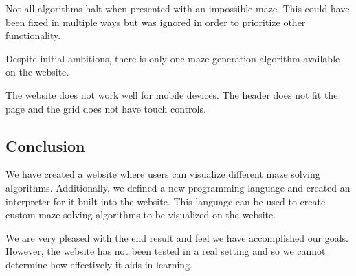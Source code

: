 Not all algorithms halt when presented with an impossible maze. This could have been fixed in multiple ways but was ignored in order to prioritize other functionality.

Despite initial ambitions, there is only one maze generation algorithm available on the website.

The website does not work well for mobile devices. The header does not fit the page and the grid does not have touch controls.

\subsection{Conclusion}

We have created a website where users can visualize different maze solving algorithms. Additionally, we defined a new programming language and created an interpreter for it built into the website. This language can be used to create custom maze solving algorithms to be visualized on the website.

We are very pleased with the end result and feel we have accomplished our goals. However, the website has not been tested in a real setting and so we cannot determine how effectively it aids in learning.
